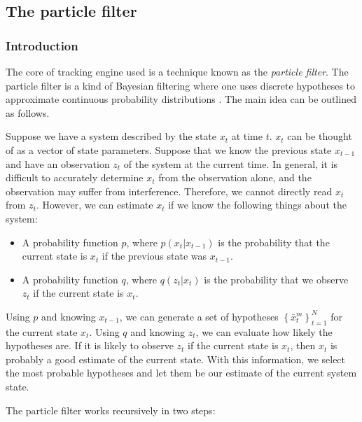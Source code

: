 \newcommand{\xtmN}[4]{
  \left\{#1_{#2}^{#3}\right\}_{#2=1}^{#4}
}
\newcommand{\interval}[2]{
  \left[#1, #2\right]
}
\newcommand{\bel}[1]{
  bel\left(#1\right)
}

\subsection{The particle filter}
\subsubsection{Introduction}
The core of tracking engine used is a technique known as the \emph{particle filter}. The particle filter is a kind of Bayesian filtering where one uses discrete hypotheses to approximate continuous probability distributions \cite{ProbRob}. The main idea can be outlined as follows.

Suppose we have a system described by the state $x_t$ at time $t$. $x_t$ can be thought of as a vector of state parameters. Suppose that we know the previous state $x_{t-1}$ and have an observation $z_t$ of the system at the current time. In general, it is difficult to accurately determine $x_t$ from the observation alone, and the observation may suffer from interference. Therefore, we cannot directly read $x_t$ from $z_t$. However, we can estimate $x_t$ if we know the following things about the system:

\begin{itemize}
\item A probability function $p$, where $p\left(x_t | x_{t-1}\right)$ is the probability that the current state is $x_t$ if the previous state was $x_{t-1}$.
\item A probability function $q$, where $q\left(z_t | x_t\right)$ is the probability that we observe $z_t$ if the current state is $x_t$.
\end{itemize}

Using $p$ and knowing $x_{t-1}$, we can generate a set of hypotheses $\xtmN{\bar{x}}{t}{m}{N}$ for the current state $x_t$. Using $q$ and knowing $z_t$, we can evaluate how likely the hypotheses are. If it is likely to observe $z_t$ if the current state is $x_t$, then $x_t$ is probably a good estimate of the current state. With this information, we select the most probable hypotheses and let them be our estimate of the current system state.

The particle filter works recursively in two steps:

